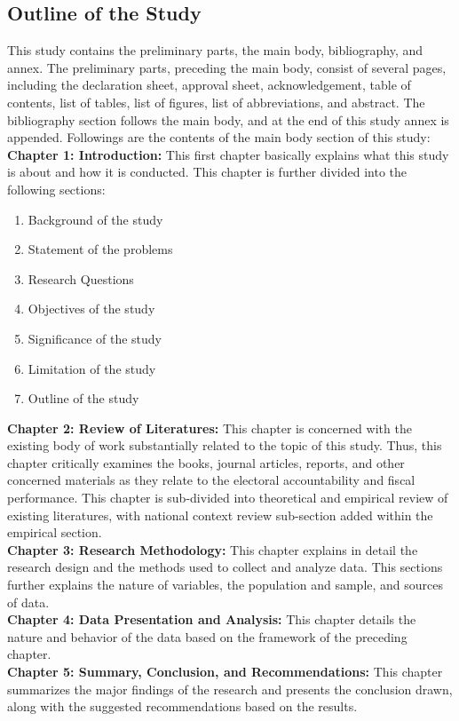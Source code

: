 \subsection{Outline of the Study} 
This study contains the preliminary parts, the main body, bibliography, and annex. The preliminary parts, preceding the main body, consist of several pages, including the declaration sheet, approval sheet, acknowledgement, table of contents, list of tables, list of figures, list of abbreviations, and abstract. The bibliography section follows the main body, and at the end of this study annex is appended. Followings are the contents of the main body section of this study:\\
\textbf{{Chapter 1}: \hspace{0.75mm} Introduction:}\hspace{3mm} This first chapter basically explains what this study is about and how it is conducted. This chapter is further divided into the following sections:  
\begin{enumerate}[label=\roman*.]  
     \item Background of the study
    \item Statement of the problems
    \item Research Questions
    \item Objectives of the study
    \item Significance of the study
    \item Limitation of the study
    \item Outline of the study
\end{enumerate}
\textbf{{Chapter 2}: \hspace{0.75mm}Review of Literatures:}\hspace{3mm} This chapter is concerned with the existing body of work substantially related to the topic of this study. Thus, this chapter critically examines the books, journal articles, reports, and other concerned materials as they relate to the electoral accountability and fiscal performance. This chapter is sub-divided into theoretical and empirical review of existing literatures, with national context review sub-section added within the empirical section.\\
\textbf{{Chapter 3}: \hspace{0.75mm}Research Methodology:}\hspace{3mm} This chapter explains in detail the research design and the methods used to collect and analyze data. This sections further explains the nature of variables, the population and sample, and sources of data.\\
\textbf{{Chapter 4}: \hspace{0.75mm}Data Presentation and Analysis:}\hspace{3mm} This chapter details the nature and behavior of the data based on the framework of the preceding chapter. \\
\textbf{{Chapter 5}: \hspace{0.75mm}Summary, Conclusion, and Recommendations:}\hspace{3mm} This chapter summarizes the major findings of the research and presents the conclusion drawn, along with the suggested recommendations based on the results. 
